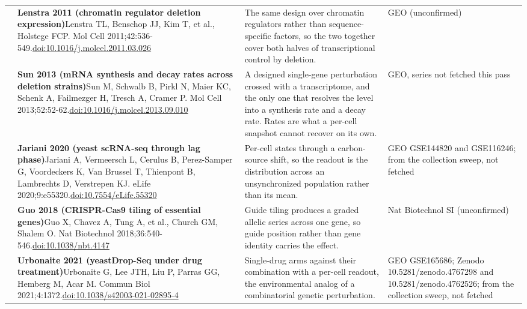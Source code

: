 \begin{landscape}
\begin{longtable}{@{}r@{\hspace{4pt}} L{86mm} L{92mm} L{62mm}@{}}
 & \textbf{Lenstra 2011 (chromatin regulator deletion expression)}\newline Lenstra TL, Benschop JJ, Kim T, et al., Holstege FCP. Mol Cell 2011;42:536-549.\newline \href{https://doi.org/10.1016/j.molcel.2011.03.026}{doi:10.1016/\allowbreak j.molcel.2011.03.026} & The same design over chromatin regulators rather than sequence-specific factors, so the two together cover both halves of transcriptional control by deletion. & GEO (unconfirmed) \\
 & \textbf{Sun 2013 (mRNA synthesis and decay rates across deletion strains)}\newline Sun M, Schwalb B, Pirkl N, Maier KC, Schenk A, Failmezger H, Tresch A, Cramer P. Mol Cell 2013;52:52-62.\newline \href{https://doi.org/10.1016/j.molcel.2013.09.010}{doi:10.1016/\allowbreak j.molcel.2013.09.010} & A designed single-gene perturbation crossed with a transcriptome, and the only one that resolves the level into a synthesis rate and a decay rate. Rates are what a per-cell snapshot cannot recover on its own. & GEO, series not fetched this pass \\
 & \textbf{Jariani 2020 (yeast scRNA-seq through lag phase)}\newline Jariani A, Vermeersch L, Cerulus B, Perez-Samper G, Voordeckers K, Van Brussel T, Thienpont B, Lambrechts D, Verstrepen KJ. eLife 2020;9:e55320.\newline \href{https://doi.org/10.7554/eLife.55320}{doi:10.7554/\allowbreak eLife.55320} & Per-cell states through a carbon-source shift, so the readout is the distribution across an unsynchronized population rather than its mean. & GEO GSE144820 and GSE116246; from the collection sweep, not fetched \\
 & \textbf{Guo 2018 (CRISPR-Cas9 tiling of essential genes)}\newline Guo X, Chavez A, Tung A, et al., Church GM, Shalem O. Nat Biotechnol 2018;36:540-546.\newline \href{https://doi.org/10.1038/nbt.4147}{doi:10.1038/\allowbreak nbt.4147} & Guide tiling produces a graded allelic series across one gene, so guide position rather than gene identity carries the effect. & Nat Biotechnol SI (unconfirmed) \\
 & \textbf{Urbonaite 2021 (yeastDrop-Seq under drug treatment)}\newline Urbonaite G, Lee JTH, Liu P, Parras GG, Hemberg M, Acar M. Commun Biol 2021;4:1372.\newline \href{https://doi.org/10.1038/s42003-021-02895-4}{doi:10.1038/\allowbreak s42003-021-02895-4} & Single-drug arms against their combination with a per-cell readout, the environmental analog of a combinatorial genetic perturbation. & GEO GSE165686; Zenodo 10.5281/\allowbreak zenodo.4767298 and 10.5281/\allowbreak zenodo.4762526; from the collection sweep, not fetched \\

\end{longtable}
\end{landscape}
